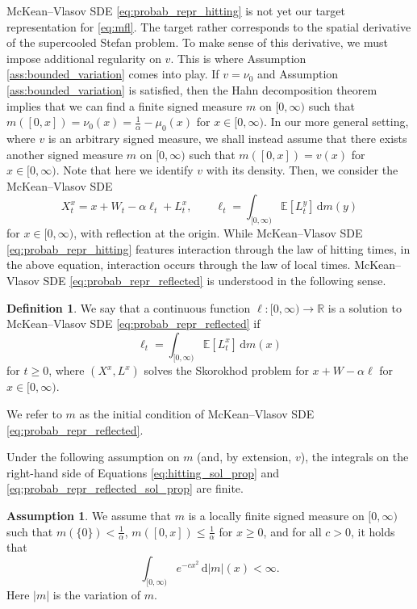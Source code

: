 \documentclass[11pt, a4paper]{article}
\theoremstyle{plain}
\theoremstyle{definition}
\newtheorem{definition}[theorem]{Definition}
\newtheorem{assumption}[theorem]{Assumption}
\theoremstyle{remark}
\numberwithin{equation}{section}
\newcommand{\ev}{\mathbb{E}}
\newcommand{\R}{\mathbb{R}}
\renewcommand{\d}{\mathrm{d}}
\newcommand{\define}{\mathpunct{:}}
\begin{document}
McKean--Vlasov SDE \eqref{eq:probab_repr_hitting} is not yet our target representation for \eqref{eq:mfl}. The target rather corresponds to the spatial derivative of the supercooled Stefan problem. To make sense of this derivative, we must impose additional regularity on $v$. This is where Assumption \ref{ass:bounded_variation} comes into play. If $v = \nu_0$ and Assumption \ref{ass:bounded_variation} is satisfied, then the Hahn decomposition theorem implies that we can find a finite signed measure $m$ on $[0, \infty)$ such that $m([0, x]) = \nu_0(x) = \frac{1}{\alpha} - \mu_0(x)$ for $x \in [0, \infty)$. In our more general setting, where $v$ is an arbitrary signed measure, we shall instead assume that there exists another signed measure $m$ on $[0, \infty)$ such that $m([0, x]) = v(x)$ for $x \in [0, \infty)$. Note that here we identify $v$ with its density. Then, we consider the McKean--Vlasov SDE
\begin{equation} \label{eq:probab_repr_reflected}
    X^x_t = x + W_t - \alpha \ell_t + L^x_t, \qquad \ell_t = \int_{[0, \infty)} \ev[L^y_t] \, \d m(y)
\end{equation}
for $x  \in [0, \infty)$, with reflection at the origin. While McKean--Vlasov SDE \eqref{eq:probab_repr_hitting} features interaction through the law of hitting times, in the above equation, interaction occurs through the law of local times. McKean--Vlasov SDE \eqref{eq:probab_repr_reflected} is understood in the following sense.

\begin{definition} \label{def:probab_repr_reflected}
We say that a continuous function $\ell \define [0, \infty) \to \R$ is a solution to McKean--Vlasov SDE \eqref{eq:probab_repr_reflected} if 
\begin{equation} \label{eq:probab_repr_reflected_sol_prop}
    \ell_t = \int_{[0, \infty)} \ev[L^x_t] \, \d m(x)
\end{equation}
for $t \geq 0$, where $(X^x, L^x)$ solves the Skorokhod problem for $x + W - \alpha \ell$ for $x \in [0, \infty)$.

We refer to $m$ as the initial condition of McKean--Vlasov SDE \eqref{eq:probab_repr_reflected}.
\end{definition}

Under the following assumption on $m$ (and, by extension, $v$), the integrals on the right-hand side of Equations \eqref{eq:hitting_sol_prop} and \eqref{eq:probab_repr_reflected_sol_prop} are finite. 

\begin{assumption} \label{ass:integrability}
We assume that $m$ is a locally finite signed measure on $[0, \infty)$ such that $m(\{0\}) < \frac{1}{\alpha}$, $m([0, x]) \leq \frac{1}{\alpha}$ for $x \geq 0$, and for all $c > 0$, it holds that
\begin{equation} \label{eq:ic_growth}
    \int_{[0, \infty)} e^{-c x^2} \, \d \lvert m\rvert(x) < \infty.
\end{equation}
Here $\lvert m\rvert$ is the variation of $m$.
\end{assumption}
\end{document}
